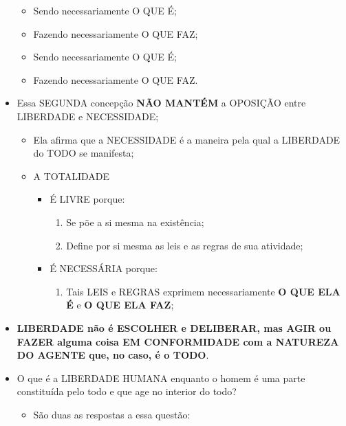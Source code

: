 \documentclass[
]{book}
\providecommand{\tightlist}{%
  \setlength{\itemsep}{0pt}\setlength{\parskip}{0pt}}
\begin{document}
\begin{itemize}
  \begin{itemize}
  \tightlist
  \item
    Sendo necessariamente O QUE É;
  \item
    Fazendo necessariamente O QUE FAZ;
  \item
    Sendo necessariamente O QUE É;
  \item
    Fazendo necessariamente O QUE FAZ.
  \end{itemize}
\item
  Essa SEGUNDA concepção \textbf{NÃO MANTÉM} a OPOSIÇÃO entre LIBERDADE
  e NECESSIDADE;

  \begin{itemize}
  \tightlist
  \item
    Ela afirma que a NECESSIDADE é a maneira pela qual a LIBERDADE do
    TODO se manifesta;
  \item
    A TOTALIDADE

    \begin{itemize}
    \tightlist
    \item
      É LIVRE porque:

      \begin{enumerate}
      \def\labelenumi{\alph{enumi}.}
      \tightlist
      \item
        Se põe a si mesma na existência;
      \item
        Define por si mesma as leis e as regras de sua atividade;
      \end{enumerate}
    \item
      É NECESSÁRIA porque:

      \begin{enumerate}
      \def\labelenumi{\alph{enumi}.}
      \tightlist
      \item
        Tais LEIS e REGRAS exprimem necessariamente \textbf{O QUE ELA É}
        e \textbf{O QUE ELA FAZ};
      \end{enumerate}
    \end{itemize}
  \end{itemize}
\item
  \textbf{LIBERDADE não é ESCOLHER e DELIBERAR, mas AGIR ou FAZER alguma
  coisa EM CONFORMIDADE com a NATUREZA DO AGENTE que, no caso, é o
  TODO}.
\item
  O que é a LIBERDADE HUMANA enquanto o homem é uma parte constituída
  pelo todo e que age no interior do todo?

  \begin{itemize}
  \tightlist
  \item
    São duas as respostas a essa questão:


\end{itemize}
\end{itemize}
\end{document}
